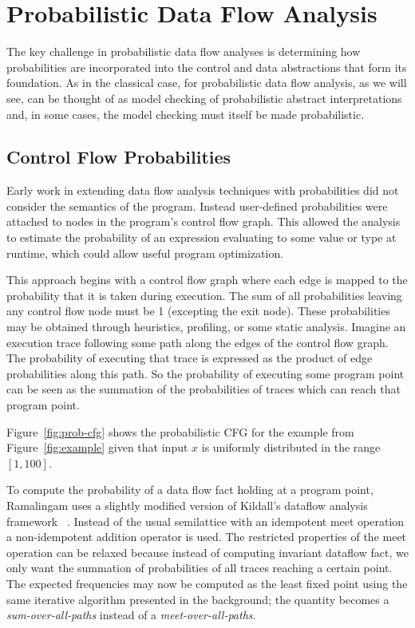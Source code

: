 \section{Probabilistic Data Flow Analysis}
\label{sec:pdfa}

The key challenge in probabilistic data flow analyses is
determining how probabilities are incorporated into the control
and data abstractions that form its foundation.
As in the classical case, for probabilistic data flow analysis,
as we will see, can be thought of as model checking
of probabilistic abstract interpretations and, in some
cases, the model checking must itself be made probabilistic.

\subsection{Control Flow Probabilities}
Early work in extending data flow analysis 
techniques with probabilities did not consider
the semantics of the program. 
Instead user-defined probabilities 
were attached to nodes in the program's control flow graph.  
This allowed the analysis to estimate
the probability of an expression evaluating 
to some value or type at runtime, which could 
allow useful program optimization.

This approach begins with a control flow graph where each edge is 
mapped to the probability that it is taken during execution.
The sum of all probabilities leaving any control flow node must be 1
(excepting the exit node).
These probabilities may be obtained through heuristics, profiling,
or some static analysis.
Imagine an execution trace following some path along the edges of
the control flow graph.
The probability of executing that trace is expressed as the product of 
edge probabilities along this path.
So the probability of executing some program point can be seen as the
summation of the probabilities of traces which can reach that program point.


Figure~\ref{fig:prob-cfg} shows the probabilistic CFG for the
example from Figure~\ref{fig:example} given that input $x$
is uniformly distributed in the range $[1,100]$.

To compute the probability of a data flow fact holding 
at a program point, Ramalingam uses a slightly
modified version of Kildall's dataflow analysis framework
~\cite{ramalingam1996data}.
Instead of the usual semilattice with an idempotent meet
operation a non-idempotent addition operator is used.
The restricted properties of the meet operation can be
relaxed because instead of computing invariant dataflow
fact, we only want the summation of probabilities of all
traces reaching a certain point.
The expected frequencies may now be computed as the least
fixed point using the same iterative algorithm presented
in the background; the quantity becomes a
{\sl sum-over-all-paths} instead of a {\sl meet-over-all-paths}.


